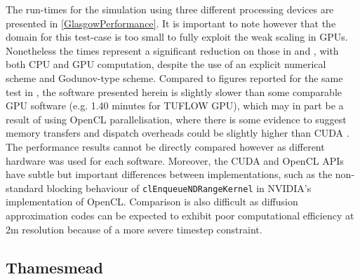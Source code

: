 \documentclass[11pt,english,a4paper]{article}
\begin{document}
The run-times for the simulation using three different processing devices are presented in \ref{GlasgowPerformance}. It is important to note however that the domain for this test-case is too small to fully exploit the weak scaling in GPUs. Nonetheless the times represent a significant reduction on those in \citet{Pender2010} and \citet{Hunter2007}, with both CPU and GPU computation, despite the use of an explicit numerical scheme and Godunov-type scheme. Compared to figures reported for the same test in \citet{Pender2013}, the software presented herein is slightly slower than some comparable GPU software (e.g. 1.40 minutes for TUFLOW GPU), which may in part be a result of using OpenCL parallelisation, where there is some evidence to suggest memory transfers and dispatch overheads could be slightly higher than CUDA \citep[e.g.][]{Karimi2010}. The performance results cannot be directly compared however as different hardware was used for each software. Moreover, the CUDA and OpenCL APIs have subtle but important differences between implementations, such as the non-standard blocking behaviour of \texttt{clEnqueueNDRangeKernel} in NVIDIA's implementation of OpenCL. Comparison is also difficult as diffusion approximation codes can be expected to exhibit poor computational efficiency at 2m resolution because of a more severe timestep constraint.

\subsection{Thamesmead}
\end{document}
